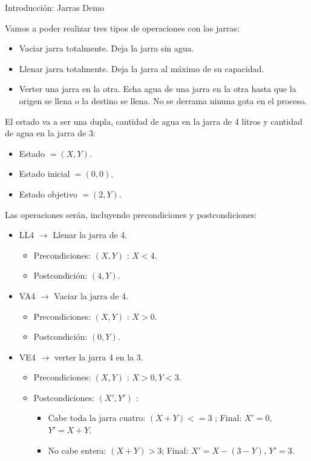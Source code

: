 \documentclass[11pt, a4paper, spanish, openright, twoside]{book}
\begin{document}
\begin{section}{Introducción: Jarras Demo}

	Vamos a poder realizar tres tipos de operaciones con las jarras:
	
	\begin{itemize}

		\item Vaciar jarra totalmente. Deja la jarra sin agua.
		\item Llenar jarra totalmente. Deja la jarra al máximo de su capacidad.
		\item Verter una jarra en la otra. Echa agua de una jarra en la otra hasta que la origen se llena 
			o la destino se llena. No se derrama ninuna gota en el proceso.
	\end{itemize}
	El estado va a ser una dupla, cantidad de agua en la jarra de 4 litros y cantidad de agua en la jarra de 3:
	\begin{itemize} 
		
		\item Estado $= (X, Y)$.
		\item Estado inicial $= (0, 0)$.
		\item Estado objetivo $= (2, Y)$.
		
	\end{itemize}
	
	Las operaciones serán, incluyendo precondiciones y postcondiciones:
		\begin{itemize}
		\item LL4 $\rightarrow$ Llenar la jarra de 4.
			\begin{itemize}
			\item Precondiciones: $ (X, Y)$ : $X < 4$.
			\item Postcondición: $(4, Y)$.
			\end{itemize}
		
		\item VA4 $\rightarrow$ Vaciar la jarra de 4.
			\begin{itemize}
			\item Precondiciones: $(X, Y)$ : $X > 0$.
			\item Postcondición: $(0, Y)$.
			\end{itemize}

		\item VE4 $\rightarrow$ verter la jarra 4 en la 3.
			\begin{itemize}
			\item Precondiciones: $(X, Y)$ : $X > 0, Y < 3$.
			\item Postcondiciones: $(X', Y')$ : 
				\begin{itemize}
					\item Cabe toda la jarra cuatro:  $(X + Y) <= 3$ ; Final: $X'= 0$, $Y' = X + Y$.
					\item No cabe entera: $(X + Y) > 3$;	Final: $X'= X - (3 - Y)$, $Y'= 3$.
				\end{itemize}
			\end{itemize}


\end{itemize}
\end{section}
\end{document}
